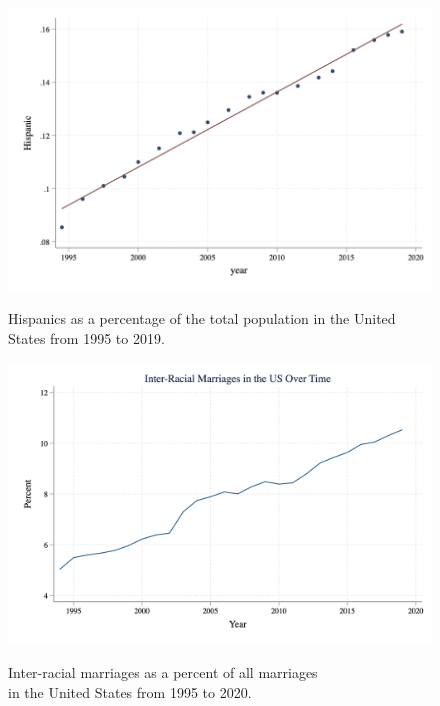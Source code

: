\documentclass[12pt, fullpage]{article}
\begin{document}
\pagebreak
\newpage

\begin{figure}[H]
\begin{center}
\caption{Hispanics as a percentage of the total population in the United States from 1995 to 2019.}
\includegraphics[width=\textwidth]{HispanicUSA.png} 
\label{fig:2}
\end{center}
\end{figure}

\pagebreak
\newpage

\begin{figure}[H]
\begin{center}
\caption{Inter-racial marriages as a percent of all marriages \\
 in the United States from 1995 to 2020.}
\includegraphics[width=\textwidth]{interracialovertime.png} 
\label{fig:3}
\end{center}
\end{figure}
\end{document}
